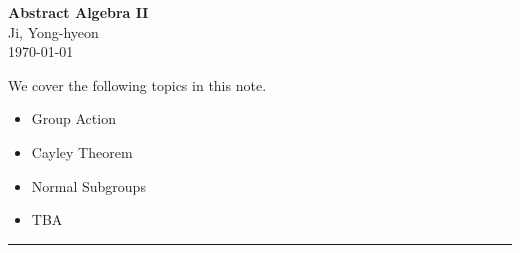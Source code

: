 \documentclass[11pt,openany]{article}
\begin{document}
\begin{center}
	\huge\textbf{Abstract Algebra II}\\
	\vspace{0.5em}
	\large{Ji, Yong-hyeon}\\
	\vspace{0.5em}
	\normalsize{\today}\\
\end{center}

\noindent 
We cover the following topics in this note.
\begin{itemize}
	\item Group Action
	\item Cayley Theorem
	\item Normal Subgroups
	\item TBA
\end{itemize}
\hrule\vspace{12pt}
\tableofcontents
\end{document}
